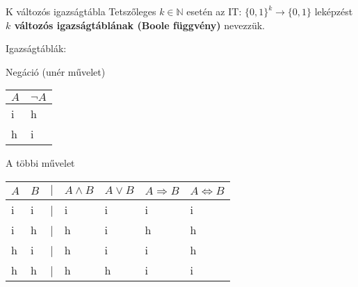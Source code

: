 \documentclass{beamer}
\begin{document}
\begin{frame}

\begin{block}{K változós igazságtábla}
Tetszőleges $k \in \mathbb{N}$ esetén az IT: $\{0, 1\}^k \rightarrow \{0, 1\}$ leképzést \textbf{$k$ változós igazságtáblának (Boole függvény)} nevezzük.
\end{block}

\begin{block}{Igazságtáblák:}
\begin{table}[h!]
\centering
Negáció (unér művelet)\\
\bigskip
\begin{tabular}{@{}C{3em}C{3em}@{}}
\toprule
\textbf{$A$} & \textbf{${\neg}A$} \\
\hline
i & h\\
\hdashline
h & i\\
\toprule
\end{tabular}
\end{table}
\bigskip

\begin{table}[h!]
\centering
A többi művelet\\
\bigskip
\begin{tabular}{C{1em}C{1em}rC{4.4em}C{4.4em}C{4.4em}C{4.4em}}
\toprule
\textbf{$A$} & \textbf{$B$} & \textbf{$|$} & \textbf{$A \land B$} & \textbf{$A \lor B$} & \textbf{$A \Rightarrow B$} & \textbf{$A \iff B$} \\
\hline
i & i & | & i & i & i & i\\
\hdashline
i & h & | & h & i & h & h\\
\hdashline
h & i & | & h & i & i & h\\
\hdashline
h & h & | & h & h & i & i\\
\toprule
\end{tabular}
\end{table}

\end{block}

\end{frame}

\end{document}
